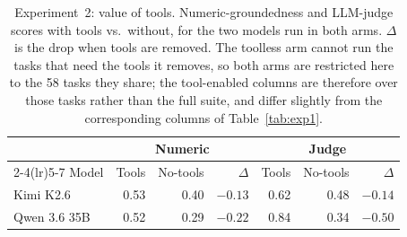 \begin{table}[!t]
\centering
\caption{Experiment~2: value of tools. Numeric-groundedness and LLM-judge scores with tools vs.\ without, for the two models run in both arms. $\Delta$ is the drop when tools are removed. The toolless arm cannot run the tasks that need the tools it removes, so both arms are restricted here to the 58 tasks they share; the tool-enabled columns are therefore over those tasks rather than the full suite, and differ slightly from the corresponding columns of Table~\ref{tab:exp1}.}
\label{tab:exp1_toolless}
\small
\setlength{\tabcolsep}{4pt}
\begin{tabular}{@{}lrrrrrr@{}}
\toprule
& \multicolumn{3}{c}{Numeric} & \multicolumn{3}{c}{Judge} \\
\cmidrule(lr){2-4}\cmidrule(lr){5-7}
Model & Tools & No-tools & $\Delta$ & Tools & No-tools & $\Delta$ \\
\midrule
Kimi K2.6 & 0.53 & 0.40 & $-0.13$ & 0.62 & 0.48 & $-0.14$ \\
Qwen 3.6 35B & 0.52 & 0.29 & $-0.22$ & 0.84 & 0.34 & $-0.50$ \\
\bottomrule
\end{tabular}
\end{table}
